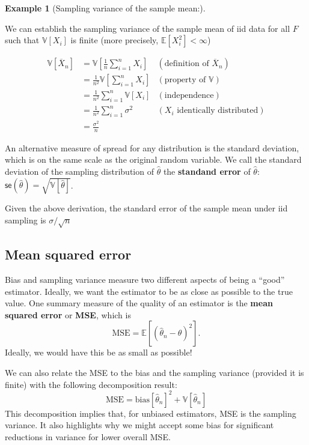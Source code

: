 \documentclass[
  letterpaper,
  DIV=11,
  numbers=noendperiod]{scrreprt}
\newcommand{\E}{\mathbb{E}}
\newcommand{\V}{\mathbb{V}}
\newcommand{\se}{\textsf{se}}
\newcommand{\Xbar}{\overline{X}}
\theoremstyle{definition}
\theoremstyle{plain}
\theoremstyle{definition}
\newtheorem{example}{Example}[chapter]
\theoremstyle{remark}
\begin{document}
\leavevmode{}%
\begin{example}[Sampling variance of the sample
mean:]\label{exm-mean-var}

We can establish the sampling variance of the sample mean of iid data
for all \(F\) such that \(\V[X_i]\) is finite (more precisely,
\(\E[X_i^2] < \infty\))

\[\begin{aligned}
  \V\left[ \Xbar_n \right] &= \V\left[ \frac{1}{n} \sum_{i=1}^n X_i \right] & (\text{definition of } \Xbar_n) \\
                           &=\frac{1}{n^2} \V\left[ \sum_{i=1}^n X_i \right] & (\text{property of } \V)\\
                           &=\frac{1}{n^2} \sum_{i=1}^n \V[X_i] & (\text{independence})\\
                           &= \frac{1}{n^2}\sum_{i=1}^n \sigma^2 & (X_i \text{ identically distributed})\\
                           &= \frac{\sigma^2}{n}
\end{aligned}\]

\end{example}

An alternative measure of spread for any distribution is the standard
deviation, which is on the same scale as the original random variable.
We call the standard deviation of the sampling distribution of
\(\widehat{\theta}\) the \textbf{standand error} of
\(\widehat{\theta}\):
\(\se(\widehat{\theta}) = \sqrt{\V[\widehat{\theta}]}\).

Given the above derivation, the standard error of the sample mean under
iid sampling is \(\sigma / \sqrt{n}\)

\hypertarget{mean-squared-error}{%
\subsection{Mean squared error}\label{mean-squared-error}}

Bias and sampling variance measure two different aspects of being a
``good'' estimator. Ideally, we want the estimator to be as close as
possible to the true value. One summary measure of the quality of an
estimator is the \textbf{mean squared error} or \textbf{MSE}, which is\\
\[
\text{MSE} = \E[(\widehat{\theta}_n-\theta)^2].
\] Ideally, we would have this be as small as possible!

We can also relate the MSE to the bias and the sampling variance
(provided it is finite) with the following decomposition result: \[
\text{MSE} = \text{bias}[\widehat{\theta}_n]^2 + \V[\widehat{\theta}_n]
\] This decomposition implies that, for unbiased estimators, MSE is the
sampling variance. It also highlights why we might accept some bias for
significant reductions in variance for lower overall MSE.
\end{document}
